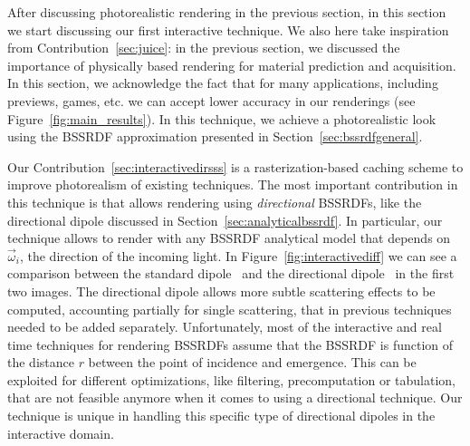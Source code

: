 %
After discussing photorealistic rendering in the previous section, in this section we start discussing our first interactive technique. We also here take inspiration from Contribution~\ref{sec:juice}: in the previous section, we discussed the importance of physically based rendering for material prediction and acquisition. In this section, we acknowledge the fact that for many applications, including previews, games, etc. we can accept lower accuracy in our renderings (see Figure~\ref{fig:main_results}). In this technique, we achieve a photorealistic look using the BSSRDF approximation presented in Section~\ref{sec:bssrdfgeneral}.

Our Contribution~\ref{sec:interactivedirsss} is a rasterization-based caching scheme to improve photorealism of existing techniques. The most important contribution in this technique is that allows rendering using \emph{directional} BSSRDFs, like the directional dipole discussed in Section~\ref{sec:analyticalbssrdf}. In particular, our technique allows to render with any BSSRDF analytical model that depends on $\vec{\omega}_i$, the direction of the incoming light. In Figure~\ref{fig:interactivediff} we can see a  comparison between the standard dipole~\cite{Jensen2001} and the directional dipole~\cite{Frisvad2014} in the first two images. The directional dipole allows more subtle scattering effects to be computed, accounting partially for single scattering, that in previous techniques needed to be added separately. Unfortunately, most of the interactive and real time techniques for rendering BSSRDFs assume that the BSSRDF is function of the distance $r$ between the point of incidence and emergence. This can be exploited for different optimizations, like filtering, precomputation or tabulation, that are not feasible anymore when it comes to using a directional technique. Our technique is unique in handling this specific type of directional dipoles in the interactive domain. 

